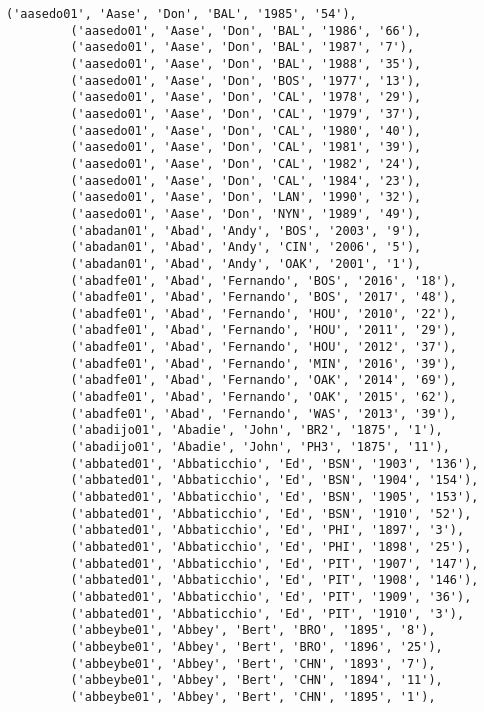 \documentclass[11pt]{article}
\begin{document}
\begin{Verbatim}[commandchars=\\\{\}]
         ('aasedo01', 'Aase', 'Don', 'BAL', '1985', '54'),
         ('aasedo01', 'Aase', 'Don', 'BAL', '1986', '66'),
         ('aasedo01', 'Aase', 'Don', 'BAL', '1987', '7'),
         ('aasedo01', 'Aase', 'Don', 'BAL', '1988', '35'),
         ('aasedo01', 'Aase', 'Don', 'BOS', '1977', '13'),
         ('aasedo01', 'Aase', 'Don', 'CAL', '1978', '29'),
         ('aasedo01', 'Aase', 'Don', 'CAL', '1979', '37'),
         ('aasedo01', 'Aase', 'Don', 'CAL', '1980', '40'),
         ('aasedo01', 'Aase', 'Don', 'CAL', '1981', '39'),
         ('aasedo01', 'Aase', 'Don', 'CAL', '1982', '24'),
         ('aasedo01', 'Aase', 'Don', 'CAL', '1984', '23'),
         ('aasedo01', 'Aase', 'Don', 'LAN', '1990', '32'),
         ('aasedo01', 'Aase', 'Don', 'NYN', '1989', '49'),
         ('abadan01', 'Abad', 'Andy', 'BOS', '2003', '9'),
         ('abadan01', 'Abad', 'Andy', 'CIN', '2006', '5'),
         ('abadan01', 'Abad', 'Andy', 'OAK', '2001', '1'),
         ('abadfe01', 'Abad', 'Fernando', 'BOS', '2016', '18'),
         ('abadfe01', 'Abad', 'Fernando', 'BOS', '2017', '48'),
         ('abadfe01', 'Abad', 'Fernando', 'HOU', '2010', '22'),
         ('abadfe01', 'Abad', 'Fernando', 'HOU', '2011', '29'),
         ('abadfe01', 'Abad', 'Fernando', 'HOU', '2012', '37'),
         ('abadfe01', 'Abad', 'Fernando', 'MIN', '2016', '39'),
         ('abadfe01', 'Abad', 'Fernando', 'OAK', '2014', '69'),
         ('abadfe01', 'Abad', 'Fernando', 'OAK', '2015', '62'),
         ('abadfe01', 'Abad', 'Fernando', 'WAS', '2013', '39'),
         ('abadijo01', 'Abadie', 'John', 'BR2', '1875', '1'),
         ('abadijo01', 'Abadie', 'John', 'PH3', '1875', '11'),
         ('abbated01', 'Abbaticchio', 'Ed', 'BSN', '1903', '136'),
         ('abbated01', 'Abbaticchio', 'Ed', 'BSN', '1904', '154'),
         ('abbated01', 'Abbaticchio', 'Ed', 'BSN', '1905', '153'),
         ('abbated01', 'Abbaticchio', 'Ed', 'BSN', '1910', '52'),
         ('abbated01', 'Abbaticchio', 'Ed', 'PHI', '1897', '3'),
         ('abbated01', 'Abbaticchio', 'Ed', 'PHI', '1898', '25'),
         ('abbated01', 'Abbaticchio', 'Ed', 'PIT', '1907', '147'),
         ('abbated01', 'Abbaticchio', 'Ed', 'PIT', '1908', '146'),
         ('abbated01', 'Abbaticchio', 'Ed', 'PIT', '1909', '36'),
         ('abbated01', 'Abbaticchio', 'Ed', 'PIT', '1910', '3'),
         ('abbeybe01', 'Abbey', 'Bert', 'BRO', '1895', '8'),
         ('abbeybe01', 'Abbey', 'Bert', 'BRO', '1896', '25'),
         ('abbeybe01', 'Abbey', 'Bert', 'CHN', '1893', '7'),
         ('abbeybe01', 'Abbey', 'Bert', 'CHN', '1894', '11'),
         ('abbeybe01', 'Abbey', 'Bert', 'CHN', '1895', '1'),

\end{Verbatim}
\end{document}
